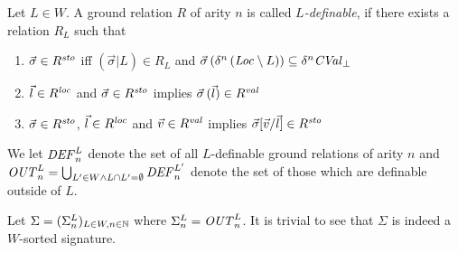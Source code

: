 \documentclass[12pt,a4paper]{report}
\begin{document}
\begin{definition}[$L$-definability]
  Let $L \in W$. A ground relation $R$ of arity $n$ is called {\em $L$-definable}, if there
  exists a relation $R_L$ such that
  \begin{enumerate}
    \item $\vec{\sigma}\in R^{\mathit{sto}}$ iff $(\vec{\sigma}|L) \in R_L$ and
          $\vec{\sigma}\,(\delta^n\,(\mathit{Loc} \setminus L)) \subseteq \delta^n \mathit{CVal}_\bot$
    \item $\vec{l}\in R^{\mathit{loc}}$ and $\vec{\sigma}\in R^{\mathit{sto}}$ implies $\vec{\sigma}\,(\vec{l})\in R^{\mathit{val}}$
    \item $\vec{\sigma}\in R^{\mathit{sto}}$, $\vec{l}\in R^{\mathit{loc}}$ and $\vec{v}\in R^{\mathit{val}}$ implies
          $\vec{\sigma}[\vec{v}/\vec{l}]\in R^{\mathit{sto}}$
  \end{enumerate}
\end{definition}

We let $\mathit{DEF}^L_n$ denote the set of all $L$-definable ground relations
of arity $n$ and $\mathit{OUT}^L_n = \bigcup_{L'\in W\wedge L \cap L' = \emptyset} \mathit{DEF}^{L'}_n$ denote
the set of those which are definable outside of $L$.

Let $\Sigma = (\Sigma^L_n)_{L\in W,n\in \mathbb N}$ where $\Sigma^L_n = \mathit{OUT}^L_n$. It is trivial to see
that $\Sigma$ is indeed a $W$-sorted signature.
\end{document}

